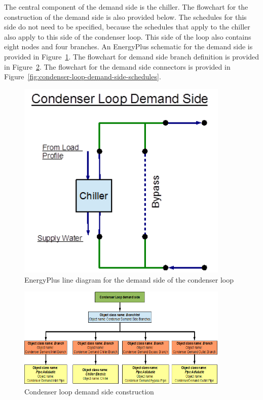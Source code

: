 The central component of the demand side is the chiller. The flowchart for the construction of the demand side is also provided below. The schedules for this side do not need to be specified, because the schedules that apply to the chiller also apply to this side of the condenser loop. This side of the loop also contains eight nodes and four branches. An EnergyPlus schematic for the demand side is provided in Figure~\ref{fig:energyplus-line-diagram-for-the-demand-side}. The flowchart for demand side branch definition is provided in Figure~\ref{fig:condenser-loop-demand-side-construction}. The flowchart for the demand side connectors is provided in Figure~\ref{fig:condenser-loop-demand-side-schedules}.

\begin{figure}[hbtp] %
\centering
\includegraphics[width=0.9\textwidth, height=0.9\textheight, keepaspectratio=true]{media/image034.png}
\caption{EnergyPlus line diagram for the demand side of the condenser loop \protect \label{fig:energyplus-line-diagram-for-the-demand-side}}
\end{figure}

\begin{figure}[hbtp] %
\centering
\includegraphics[width=0.9\textwidth, height=0.9\textheight, keepaspectratio=true]{media/image035.png}
\caption{Condenser loop demand side construction \protect \label{fig:condenser-loop-demand-side-construction}}
\end{figure}

